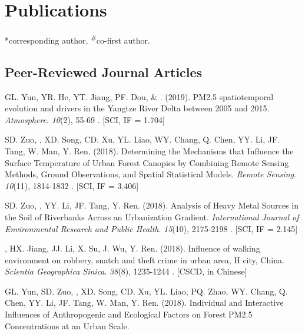 \newcommand{\Revision}{\textit{under revision}}
\newcommand{\Review}{\textit{under review}}
\newcommand{\CS}{*} %
\newcommand{\CF}{\textsuperscript{\#}} %

\section*{Publications}
\CS corresponding author, \CF co-first author.

\subsection*{Peer-Reviewed Journal Articles}
\begin{etaremune}
\item
    GL. Yun, YR. He, YT. Jiang, PF. Dou, \& \Shaoqing. (2019).
    PM2.5 spatiotemporal evolution and drivers in the Yangtze River Delta between 2005 and 2015.
    \textit{Atmosphere}. \textit{10}(2), 55-69
    . [SCI, IF = 1.704]
\item
    SD. Zuo, \Shaoqing, XD. Song, CD. Xu, YL. Liao, WY. Chang, Q. Chen, YY. Li, JF. Tang, W. Man, Y. Ren. (2018).
    Determining the Mechanisms that Influence the Surface Temperature of Urban Forest Canopies by Combining Remote Sensing Methods, Ground Observations, and Spatial Statistical Models. 
    \textit{Remote Sensing}. \textit{10}(11), 1814-1832
    . [SCI, IF = 3.406]
\item
    SD. Zuo, \Shaoqing, YY. Li, JF. Tang, Y. Ren. (2018).
	Analysis of Heavy Metal Sources in the Soil of Riverbanks Across an Urbanization Gradient.
    \textit{International Journal of Environmental Research and Public Health}. \textit{15}(10), 2175-2198
    . [SCI, IF = 2.145]
\item
    \Shaoqing, HX. Jiang, JJ. Li, X. Su, J. Wu, Y. Ren. (2018).
	Influence of walking environment on robbery, snatch and theft crime in urban area, H city, China.
    \textit{Scientia Geographica Sinica}.  \textit{38}(8), 1235-1244
    . [CSCD, in Chinese]
\item
    GL. Yun, SD. Zuo, \Shaoqing, XD. Song, CD. Xu, YL. Liao, PQ. Zhao, WY. Chang, Q. Chen, YY. Li, JF. Tang, W. Man, Y. Ren. (2018).
	Individual and Interactive Influences of Anthropogenic and Ecological Factors on Forest PM2.5 Concentrations at an Urban Scale.

\end{etaremune}
